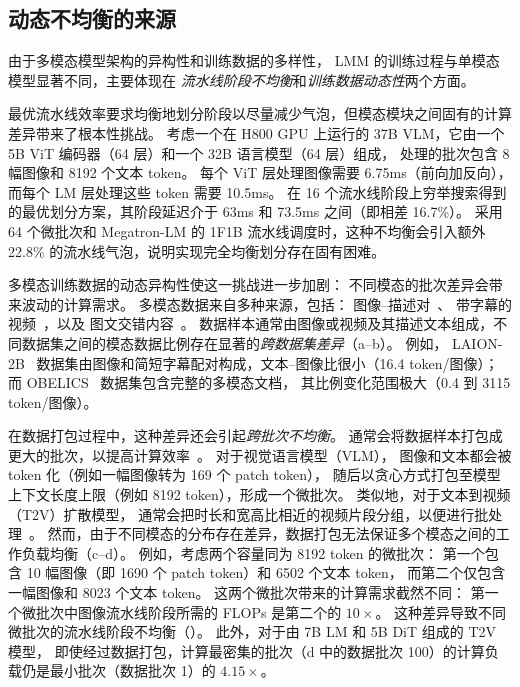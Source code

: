 \subsection{动态不均衡的来源}
\label{section:dynamic-imbalance}

由于多模态模型架构的异构性和训练数据的多样性，
LMM 的训练过程与单模态模型显著不同，主要体现在
\emph{流水线阶段不均衡}和\emph{训练数据动态性}两个方面。

最优流水线效率要求均衡地划分阶段以尽量减少气泡，但模态模块之间固有的计算差异带来了根本性挑战。
考虑一个在 H800 GPU 上运行的 37B VLM，它由一个 5B ViT 编码器（64 层）和一个 32B 语言模型（64 层）组成，
处理的批次包含 8 幅图像和 8192 个文本 token。
每个 ViT 层处理图像需要 6.75ms（前向加反向），而每个 LM 层处理这些 token 需要 10.5ms。
在 16 个流水线阶段上穷举搜索得到的最优划分方案，其阶段延迟介于 63ms 和 73.5ms 之间（即相差 16.7\%）。
采用 64 个微批次和 Megatron-LM 的 1F1B 流水线调度时，这种不均衡会引入额外 22.8\% 的流水线气泡，说明实现完全均衡划分存在固有困难。

多模态训练数据的动态异构性使这一挑战进一步加剧：
不同模态的批次差异会带来波动的计算需求。
多模态数据来自多种来源，包括：
图像--描述对~\cite{laion5b-nips22,coyo-700m}、
带字幕的视频~\cite{share-gpt4-video-arxiv24,internvid-arxiv23,mmtrail-arxiv24,msr-vtt-cvpr16}，以及
图文交错内容~\cite{obelics-arxiv23,mmc4-arxiv23}。
数据样本通常由图像或视频及其描述文本组成，不同数据集之间的模态数据比例存在显著的\emph{跨数据集差异}（a--b）。
例如，
LAION-2B~\cite{laion5b-nips22} 数据集由图像和简短字幕配对构成，文本--图像比很小（16.4 token/图像）；而 OBELICS~\cite{obelics-arxiv23} 数据集包含完整的多模态文档，
其比例变化范围极大（0.4 到 3115 token/图像）。

在数据打包过程中，这种差异还会引起\emph{跨批次不均衡}。
通常会将数据样本打包成更大的批次，以提高计算效率~\cite{dynapipe-eurosys24,wlb-llm-osdi25}。
对于视觉语言模型（VLM），
图像和文本都会被 token 化（例如一幅图像转为 169 个 patch token），
随后以贪心方式打包至模型上下文长度上限（例如 8192 token），形成一个微批次。
类似地，对于文本到视频（T2V）扩散模型，
通常会把时长和宽高比相近的视频片段分组，以便进行批处理~\cite{moviegen-arxiv24,step-t2v-arxiv25}。
然而，由于不同模态的分布存在差异，数据打包无法保证多个模态之间的工作负载均衡（c--d）。
例如，考虑两个容量同为 8192 token 的微批次：
第一个包含 10 幅图像（即 1690 个 patch token）和 6502 个文本 token，
而第二个仅包含一幅图像和 8023 个文本 token。
这两个微批次带来的计算需求截然不同：
第一个微批次中图像流水线阶段所需的 FLOPs 是第二个的 $10\times$。
这种差异导致不同微批次的流水线阶段不均衡（）。
此外，对于由 7B LM 和 5B DiT 组成的 T2V 模型，
即使经过数据打包，计算最密集的批次（d 中的数据批次 100）的计算负载仍是最小批次（数据批次 1）的 $4.15\times$。

